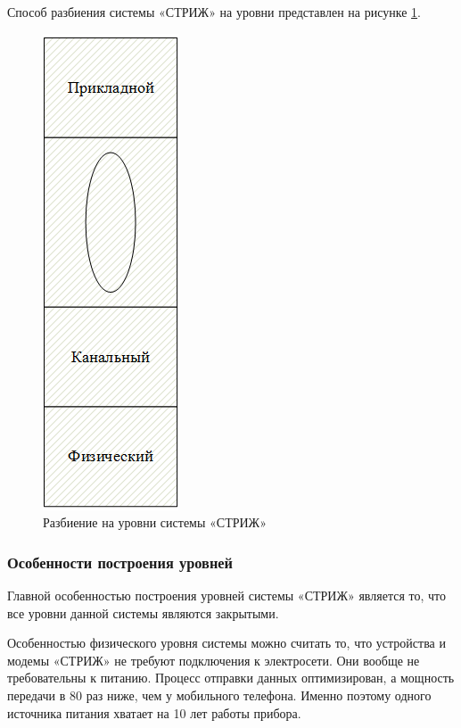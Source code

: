 Способ разбиения системы «СТРИЖ» на уровни представлен на рисунке
\ref{fig:system_levels_1}.
\begin{figure}[H]
	\centering\includegraphics[width=0.2\linewidth]{img/system_levels_1}
	\caption{Разбиение на уровни системы «СТРИЖ»}
	\label{fig:system_levels_1}
\end{figure}

\subsubsection{Особенности построения уровней}
Главной особенностью построения уровней системы «СТРИЖ» является то, что все уровни данной системы являются закрытыми.
 
Особенностью физического уровня системы можно считать то, что устройства и модемы «СТРИЖ» не требуют подключения к электросети. Они вообще не требовательны к питанию. Процесс отправки данных оптимизирован, а мощность передачи в 80 раз ниже, чем у мобильного телефона. Именно поэтому одного источника питания хватает на 10 лет работы прибора.
